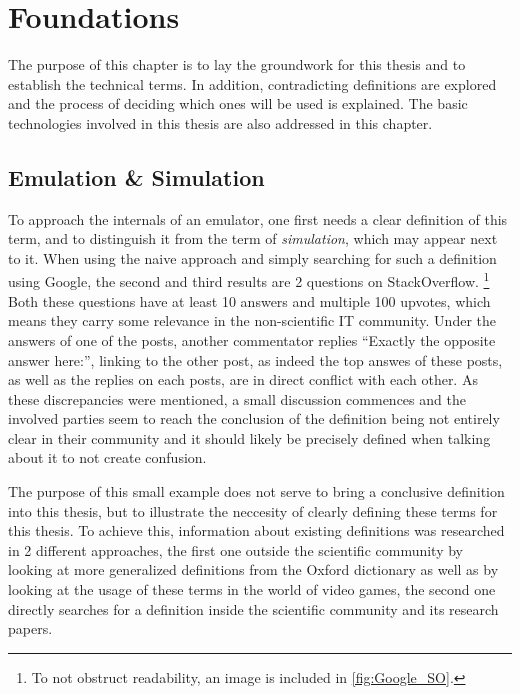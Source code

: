 \chapter{Foundations}
The purpose of this chapter is to lay the groundwork for this thesis
and to establish the technical terms.
In addition, contradicting definitions are explored
and the process of deciding which ones will be used is explained.
The basic technologies involved in this thesis are also addressed in this chapter.

\section{Emulation \& Simulation}
To approach the internals of an emulator, one first needs a clear definition of this term,
and to distinguish it from the term of \emph{simulation}, which may appear next to it.
When using the naive approach and simply searching for such a definition using Google,
the second and third results are 2 questions on StackOverflow\cite{SO_link}\cite{SO}.
\footnote{To not obstruct readability, an image is included in \autoref{fig:Google_SO}.}
Both these questions have at least 10 answers and multiple 100 upvotes,
which means they carry some relevance in the non-scientific IT community.
Under the answers of one of the posts, another commentator replies
\enquote{Exactly the opposite answer here:}\cite{SO_link},
linking to the other post\cite{SO},
as indeed the top answes of these posts, as well as the replies on each posts,
are in direct conflict with each other.
As these discrepancies were mentioned,
a small discussion commences and the involved parties seem to reach the conclusion
of the definition being not entirely clear in their community and it should likely be precisely defined when talking about it
to not create confusion.

The purpose of this small example does not serve to bring a conclusive definition into this thesis,
but to illustrate the neccesity of clearly defining these terms for this thesis.
To achieve this, information about existing definitions was researched in 2 different approaches,
the first one outside the scientific community by looking at more generalized definitions from the Oxford dictionary
as well as by looking at the usage of these terms in the world of video games,
the second one directly searches for a definition inside the scientific community and its research papers.

